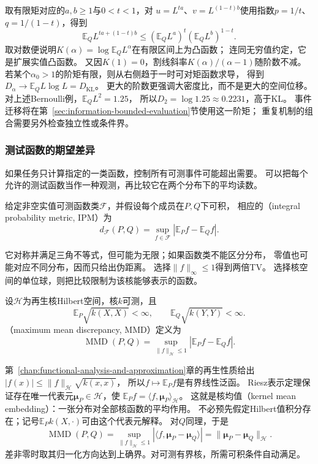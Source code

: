 取有限矩对应的\(a,b\geq1\)与\(0<t<1\)，对
\(u=L^{ta}\)、\(v=L^{(1-t)b}\)使用指数\(p=1/t\)、\(q=1/(1-t)\)，得到
\[
 \mathbb E_Q L^{ta+(1-t)b}
 \leq(\mathbb E_Q L^a)^t(\mathbb E_Q L^b)^{1-t}.
\]
取对数便说明\(K(\alpha)=\log\mathbb E_QL^\alpha\)在有限区间上为凸函数；
连同无穷值约定，它是扩展实值凸函数。
又因\(K(1)=0\)，割线斜率\(K(\alpha)/(\alpha-1)\)随阶数不减。
若某个\(\alpha_0>1\)的阶矩有限，则从右侧趋于一时可对矩函数求导，
得到\(D_\alpha\to\mathbb E_Q L\log L=D_{\mathrm{KL}}\)。
更大的阶数更强调大密度比，而不是更大的空间位移。
对上述Bernoulli例，\(\mathbb E_QL^2=1.25\)，
所以\(D_2=\log1.25\approx0.2231\)，高于KL。
事件迁移将在第~\ref{sec:information-bounded-evaluation}节使用这一阶矩；
重复机制的组合需要另外检查独立性或条件界。

\subsubsection{测试函数的期望差异}
\label{sec:information-test-functions}

如果任务只计算指定的一类函数，控制所有可测事件可能超出需要。
可以把每个允许的测试函数当作一种观测，再比较它在两个分布下的平均读数。

\begin{definition}[积分概率度量]
\label{def:information-ipm}
给定非空实值可测函数类\(\mathcal F\)，并假设每个成员在\(P,Q\)下可积，
相应的（integral probability metric, IPM）为
\begin{equation}
  d_{\mathcal F}(P,Q)=\sup_{f\in\mathcal F}
           |\mathbb E_Pf-\mathbb E_Qf|.
  \label{eq:information-ipm}
\end{equation}
\end{definition}
它对称并满足三角不等式，但可能为无限；如果函数类不能区分分布，
零值也可能对应不同分布，因而只给出伪距离。
选择\(\|f\|_\infty\leq1\)得到两倍TV。
选择核空间的单位球，则把比较限制为该核能够表示的函数。

\begin{definition}[最大均值差异]
\label{def:information-mmd}
设\(\mathcal H\)为再生核Hilbert空间，核\(k\)可测，且
\[
  \mathbb E_P\sqrt{k(X,X)}<\infty,\qquad
  \mathbb E_Q\sqrt{k(Y,Y)}<\infty.
\]
（maximum mean discrepancy, MMD）定义为
\[
  \operatorname{MMD}(P,Q)=
   \sup_{\|f\|_{\mathcal H}\leq1}|\mathbb E_Pf-\mathbb E_Qf|.
\]
\end{definition}

第~\ref{chap:functional-analysis-and-approximation}章的再生性质给出
\(|f(x)|\leq\|f\|_{\mathcal H}\sqrt{k(x,x)}\)，
所以\(f\mapsto\mathbb E_Pf\)是有界线性泛函。
Riesz表示定理保证存在唯一代表元\(\bm\mu_P\in\mathcal H\)，使
\(\mathbb E_Pf=\langle f,\bm\mu_P\rangle_{\mathcal H}\)。
这就是核均值（kernel mean embedding）：一张分布对全部核函数的平均作用。
不必预先假定Hilbert值积分存在；记号\(\mathbb E_Pk(X,\cdot)\)可由这个代表元解释。
对\(Q\)同理，于是
\[
  \operatorname{MMD}(P,Q)
  =\sup_{\|f\|_{\mathcal H}\leq1}
     |\langle f,\bm\mu_P-\bm\mu_Q\rangle|
  =\|\bm\mu_P-\bm\mu_Q\|_{\mathcal H}.
\]
差非零时取其归一化方向达到上确界。对可测有界核，所需可积条件自动满足。

